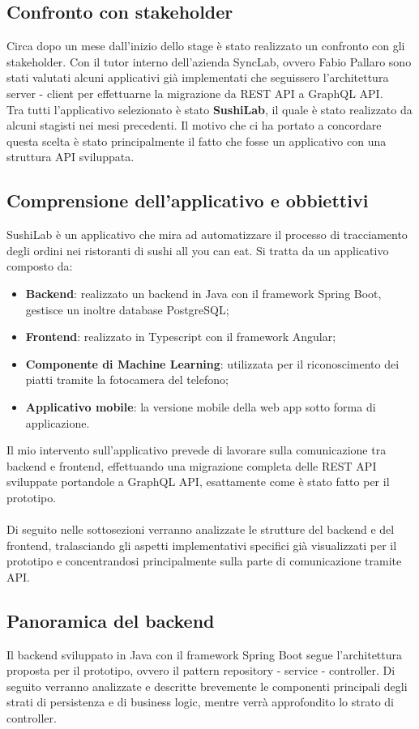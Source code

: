 \subsection{Confronto con stakeholder}
Circa dopo un mese dall'inizio dello stage è stato realizzato un confronto con gli stakeholder. Con il tutor interno dell'azienda SyncLab, ovvero Fabio Pallaro sono stati valutati alcuni applicativi già implementati che seguissero l'architettura server - client per effettuarne la migrazione da REST API a GraphQL API.\\
Tra tutti l'applicativo selezionato è stato \textbf{SushiLab}, il quale è stato realizzato da alcuni stagisti nei mesi precedenti. Il motivo che ci ha portato a concordare questa scelta è stato principalmente il fatto che fosse un applicativo con una struttura API sviluppata.
\subsection{Comprensione dell'applicativo e obbiettivi}
SushiLab è un applicativo che mira ad automatizzare il processo di tracciamento degli ordini nei ristoranti di sushi all you can eat. Si tratta da un applicativo composto da:
\begin{itemize}
  \item \textbf{Backend}: realizzato un backend in Java con il framework Spring Boot, gestisce un inoltre database PostgreSQL;
  \item \textbf{Frontend}: realizzato in Typescript con il framework Angular;
  \item \textbf{Componente di Machine Learning}: utilizzata per il riconoscimento dei piatti tramite la fotocamera del telefono;
  \item \textbf{Applicativo mobile}: la versione mobile della web app sotto forma di applicazione.
\end{itemize}
Il mio intervento sull'applicativo prevede di lavorare sulla comunicazione tra backend e frontend, effettuando una migrazione completa delle REST API sviluppate portandole a GraphQL API, esattamente come è stato fatto per il prototipo.\\\\
Di seguito nelle sottosezioni verranno analizzate le strutture del backend e del frontend, tralasciando gli aspetti implementativi specifici già visualizzati per il prototipo e concentrandosi principalmente sulla parte di comunicazione tramite API.
\subsection{Panoramica del backend}
Il backend sviluppato in Java con il framework Spring Boot segue l'architettura proposta per il prototipo, ovvero il pattern repository - service - controller. Di seguito verranno analizzate e descritte brevemente le componenti principali degli strati di persistenza e di business logic, mentre verrà approfondito lo strato di controller.
